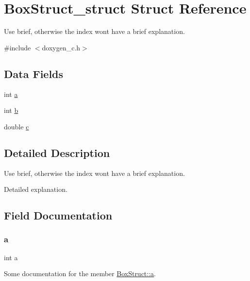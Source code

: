 \hypertarget{struct_box_struct__struct}{}\section{Box\+Struct\+\_\+struct Struct Reference}
\label{struct_box_struct__struct}


Use brief, otherwise the index won\textquotesingle{}t have a brief explanation.  




{\ttfamily \#include $<$doxygen\+\_\+c.\+h$>$}

\subsection*{Data Fields}
\begin{DoxyCompactItemize}
\item 
int \mbox{\hyperlink{struct_box_struct__struct_aa4c2a5552e9bc49b1816ff532f558c74}{a}}
\item 
int \mbox{\hyperlink{struct_box_struct__struct_a148e3876077787926724625411d6e7a9}{b}}
\item 
double \mbox{\hyperlink{struct_box_struct__struct_a2c09e929a6ea340fc9653cca414b11d3}{c}}
\end{DoxyCompactItemize}


\subsection{Detailed Description}
Use brief, otherwise the index won\textquotesingle{}t have a brief explanation. 

Detailed explanation. 

\subsection{Field Documentation}
\mbox{\label{struct_box_struct__struct_aa4c2a5552e9bc49b1816ff532f558c74}} 
\subsubsection{\texorpdfstring{a}{a}}
{\footnotesize\ttfamily int a}

Some documentation for the member \mbox{\hyperlink{struct_box_struct__struct_aa4c2a5552e9bc49b1816ff532f558c74}{Box\+Struct\+::a}}. \mbox{\label{struct_box_struct__struct_a148e3876077787926724625411d6e7a9}} 
